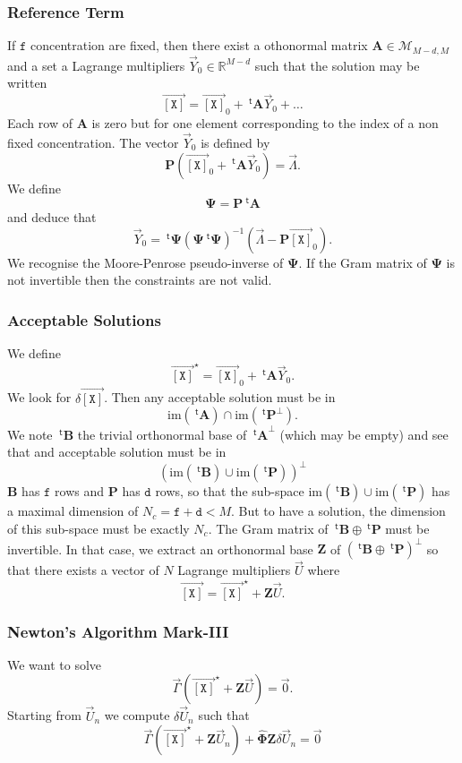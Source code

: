 \documentclass[aps,twocolumn]{revtex4}
\newcommand{\myconc}[1]{\left\lbrack #1 \right\rbrack}
\newcommand{\mychem}[1]{{\mathtt{#1}}}
\newcommand{\mymat}[1]{\boldsymbol{#1}}
\newcommand{\mytrn}[1]{{\!\!~^{\mathsf{t}}{#1}}}
\newcommand{\myvec}[1]{\overrightarrow{#1}}
\newcommand{\vecX}{\myvec{\myconc{\mychem{X}}}}
\newcommand{\dof}{\mathtt{d}}
\newcommand{\fixed}{\mathtt{f}}
\begin{document}
\subsubsection{Reference Term}
If $\fixed$ concentration are fixed, then there exist a othonormal matrix $\mymat{A}\in\mathcal{M}_{M-d,M}$ and
a set a Lagrange multipliers $\vec{Y}_0\in\mathbb{R}^{M-d}$ such that the solution may be written
\begin{equation}
	\vecX = \vecX_0 + \mytrn{\mymat{A}}\vec{Y}_0 + \ldots
\end{equation}
Each row of $\mymat{A}$ is zero but for one element corresponding to the index of a non fixed concentration.
The vector $\vec{Y}_0$ is defined by
$$
	\mymat{P}\left(\vecX_0+\mytrn{\mymat{A}}\vec{Y}_0\right) = \vec\Lambda.
$$
We define
$$
	\mymat{\Psi} = \mymat{P}\mytrn{\mymat{A}}
$$
and deduce that
$$
	\vec{Y}_0 = \mytrn{\mymat{\Psi}} \left(\mymat{\Psi} \mytrn{\mymat{\Psi}}\right)^{-1}\left( \vec{\Lambda} - \mymat{P}\vecX_0\right).
$$
We recognise the Moore-Penrose pseudo-inverse of $\mymat{\Psi}$. If the Gram matrix of $\mymat{\Psi}$ is not invertible then
the constraints are not valid.

\subsubsection{Acceptable Solutions}
We define
$$
	\vecX^\star = \vecX_0 + \mytrn{\mymat{A}}\vec{Y}_0.
$$
We look for $\delta\vecX$.
Then any acceptable solution must be in
$$
	\mathrm{im}(\mytrn{\mymat{A}}) \cap \mathrm{im}(\mytrn{\mymat{P}^\perp}).
$$
We note $\mytrn{\mymat{B}}$ the trivial orthonormal base of  $\mytrn{\mymat{A}}^\perp$ (which may be empty)
and see that and acceptable solution must be in
$$
	\left( 
	\mathrm{im}(\mytrn{\mymat{B}})
	\cup
	\mathrm{im}(\mytrn{\mymat{P}})
	\right)^\perp
$$
$\mymat{B}$ has $\fixed$ rows and $\mymat{P}$ has $\dof$ rows, so that the sub-space $\mathrm{im}(\mytrn{\mymat{B}})
	\cup
	\mathrm{im}(\mytrn{\mymat{P}})$
	has a maximal dimension of $N_c=\fixed+\dof<M$.
But to have a solution, the dimension of this sub-space must be exactly $N_c$.
The Gram matrix of $\mytrn{\mymat{B}} \oplus \mytrn{\mymat{P}}$ must be invertible.
In that case, we extract an orthonormal base $\mymat{Z}$ of  $(\mytrn{\mymat{B}} \oplus \mytrn{\mymat{P}})^\perp$
so that there exists a vector of $N$ Lagrange multipliers $\vec{U}$ where
$$
	\vecX = \vecX^\star + \mymat{Z}\vec{U}.
$$

\subsubsection{Newton's Algorithm Mark-III}
We want to solve
$$
	\vec{\Gamma}(\vecX^\star + \mymat{Z}\vec{U}) = \vec{0}.
$$
Starting from $\vec{U}_n$ we compute $\delta \vec{U}_n$ such that
$$
	\vec{\Gamma}(\vecX^\star + \mymat{Z}\vec{U}_n) + \hat{\mymat{\Phi}} \mymat{Z} \delta \vec{U}_n = \vec{0}
$$
\end{document}
